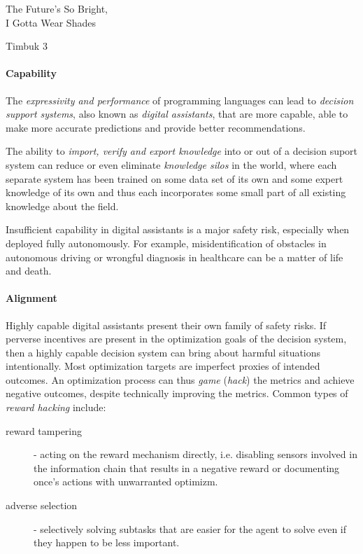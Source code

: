 \epigraph{The Future's So Bright, \\ I Gotta Wear Shades}{Timbuk 3}

\paragraph{Capability}

The \emph{expressivity and performance} of programming languages can lead to \emph{decision support systems}, also known as \emph{digital assistants}, that are more capable, able to make more accurate predictions and provide better recommendations.

The ability to \emph{import, verify and export knowledge} into or out of a decision suport system can reduce or even eliminate \emph{knowledge silos} in the world, where each separate system has been trained on some data set of its own and some expert knowledge of its own and thus each incorporates some small part of all existing knowledge about the field. 

Insufficient capability in digital assistants is a major safety risk, especially when deployed fully autonomously. For example, misidentification of obstacles in autonomous driving \cite{sheebajoiceObstacleDetectionSafe2023} or wrongful diagnosis in healthcare \cite{wintersDiagnosticErrorsIntensive2012} can be a matter of life and death.

\paragraph{Alignment}

Highly capable digital assistants present their own family of safety risks. 
If perverse incentives are present in the optimization goals of the decision system, then a highly capable decision system can bring about harmful situations intentionally.
Most optimization targets are imperfect proxies of intended outcomes. 
An optimization process can thus \emph{game} (\emph{hack}) the metrics and achieve negative outcomes, despite technically improving the metrics.
Common types of \emph{reward hacking} \cite{skalseDefiningCharacterizingReward2022} include:
\begin{description}
    \item[reward tampering] \cite{everittRewardTamperingProblems2021, skalseInvariancePolicyOptimisation2023} - acting on the reward mechanism directly, i.e. disabling sensors involved in the information chain that results in a negative reward or documenting once's actions with unwarranted optimizm.
    \item[adverse selection] - selectively solving subtasks that are easier for the agent to solve even if they happen to be less important.
\end{description}

